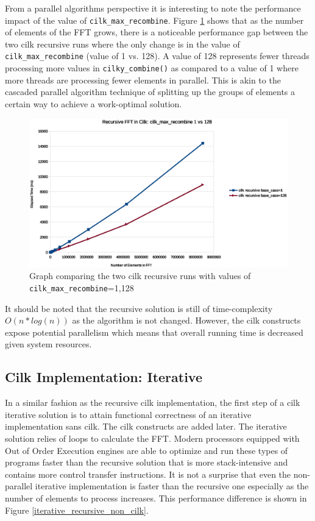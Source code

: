 From a parallel algorithms perspective it is interesting to note the performance impact of the value of \texttt{cilk\_max\_recombine}. Figure \ref{cilk_max_recombine} shows that as the number of elements of the FFT grows, there is a noticeable performance gap between the two cilk recursive runs where the only change is in the value of \texttt{cilk\_max\_recombine} (value of 1 vs. 128). A value of 128 represents fewer threads processing more values in \texttt{cilky\_combine()} as compared to a value of 1 where more threads are processing fewer elements in parallel. This is akin to the cascaded parallel algorithm technique of splitting up the groups of elements a certain way to achieve a work-optimal solution. 

\begin{figure}
\center
\includegraphics[scale=0.55]{img/cilk_max_recombine.eps}
\caption{Graph comparing the two cilk recursive runs with values of \texttt{cilk\_max\_recombine}=1,128} 
\label{cilk_max_recombine}
\end{figure}

It should be noted that the recursive solution is still of time-complexity $O(n * log(n))$ as the algorithm is not changed. However, the cilk constructs expose potential parallelism which means that overall running time is decreased given system resources. 



\subsection{Cilk Implementation: Iterative}
In a similar fashion as the recursive cilk implementation, the first step of a cilk iterative solution is to attain functional correctness of an iterative implementation sans cilk. The cilk constructs are added later. The iterative solution relies of loops to calculate the FFT. Modern processors equipped with Out of Order Execution engines are able to optimize and run these types of programs faster than the recursive solution that is more stack-intensive and contains more control transfer instructions. It is not a surprise that even the non-parallel iterative implementation is faster than the recursive one especially as the number of elements to process increases. This performance difference is shown in Figure \ref{iterative_recursive_non_cilk}.

